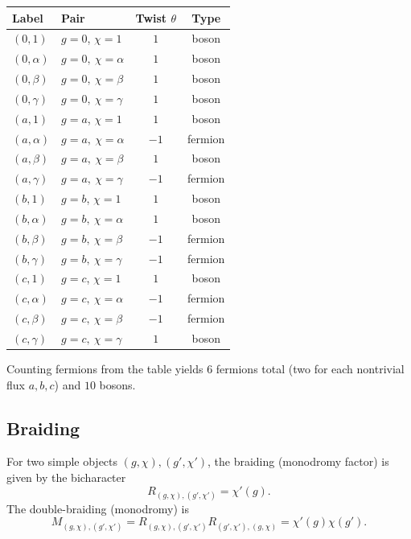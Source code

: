 \documentclass[a4paper,11pt]{article}
\theoremstyle{definition}
\theoremstyle{remark}
\theoremstyle{remark}
\begin{document}
\begin{longtable}{llcc}
\toprule
Label & Pair & Twist $\theta$ & Type \\
\midrule
\endhead
$(0,1)$  & $g=0$, $\chi=1$  & $1$ & boson \\
$(0,\alpha)$ & $g=0, \ \chi=\alpha$ & $1$ & boson \\
$(0,\beta)$  & $g=0, \ \chi=\beta$ & $1$ & boson \\
$(0,\gamma)$ & $g=0, \ \chi=\gamma$ & $1$ & boson \\
\midrule
$(a,1)$ & $g=a$, $\chi=1$ & $1$ & boson \\
$(a,\alpha)$ & $g=a, \ \chi=\alpha$ & $-1$ & fermion \\
$(a,\beta)$  & $g=a, \ \chi=\beta$ & $1$ & boson \\
$(a,\gamma)$ & $g=a, \ \chi=\gamma$ & $-1$ & fermion \\
\midrule
$(b,1)$ & $g=b$, $\chi=1$ & $1$ & boson \\
$(b,\alpha)$ & $g=b, \ \chi=\alpha$ & $1$ & boson \\
$(b,\beta)$ & $g=b, \ \chi=\beta$ & $-1$ & fermion \\
$(b,\gamma)$ & $g=b, \ \chi=\gamma$ & $-1$ & fermion \\
\midrule
$(c,1)$ & $g=c$,  $\chi=1$ & $1$ & boson \\
$(c,\alpha)$ & $g=c, \ \chi=\alpha$ & $-1$ & fermion \\
$(c,\beta)$ & $g=c, \ \chi=\beta$ & $-1$ & fermion \\
$(c,\gamma)$ & $g=c, \ \chi=\gamma$ & $1$ & boson \\
\bottomrule
\end{longtable}

Counting fermions from the table yields $6$ fermions total (two for each nontrivial flux $a,b,c$) and $10$ bosons.

\subsection*{Braiding}

For two simple objects $(g,\chi),(g',\chi')$, the braiding (monodromy factor) is given by the bicharacter
\begin{equation*}
    R_{(g,\chi),(g',\chi')} = \chi'(g).
\end{equation*}
The double-braiding (monodromy) is
\begin{equation*}
    M_{(g,\chi),(g',\chi')} = R_{(g,\chi),(g',\chi')} R_{(g',\chi'),(g,\chi)} 
    = \chi'(g)\chi(g').
\end{equation*}
\end{document}

